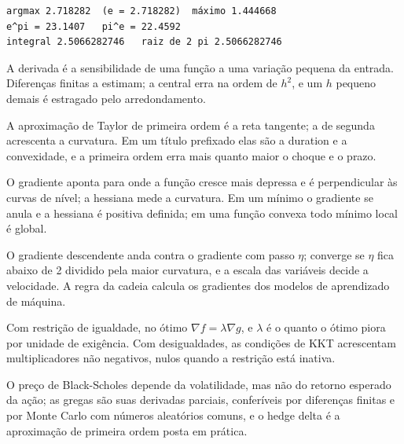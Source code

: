 
\begin{lstlisting}[style=saida]
argmax 2.718282  (e = 2.718282)  máximo 1.444668
e^pi = 23.1407   pi^e = 22.4592
integral 2.5066282746   raiz de 2 pi 2.5066282746
\end{lstlisting}

\begin{resumo}
  \item A derivada é a sensibilidade de uma função a uma variação pequena da entrada. Diferenças finitas a estimam; a central erra na ordem de $h^2$, e um $h$ pequeno demais é estragado pelo arredondamento.
  \item A aproximação de Taylor de primeira ordem é a reta tangente; a de segunda acrescenta a curvatura. Em um título prefixado elas são a duration e a convexidade, e a primeira ordem erra mais quanto maior o choque e o prazo.
  \item O gradiente aponta para onde a função cresce mais depressa e é perpendicular às curvas de nível; a hessiana mede a curvatura. Em um mínimo o gradiente se anula e a hessiana é positiva definida; em uma função convexa todo mínimo local é global.
  \item O gradiente descendente anda contra o gradiente com passo $\eta$; converge se $\eta$ fica abaixo de 2 dividido pela maior curvatura, e a escala das variáveis decide a velocidade. A regra da cadeia calcula os gradientes dos modelos de aprendizado de máquina.
  \item Com restrição de igualdade, no ótimo $\nabla f = \lambda\nabla g$, e $\lambda$ é o quanto o ótimo piora por unidade de exigência. Com desigualdades, as condições de KKT acrescentam multiplicadores não negativos, nulos quando a restrição está inativa.
  \item O preço de Black-Scholes depende da volatilidade, mas não do retorno esperado da ação; as gregas são suas derivadas parciais, conferíveis por diferenças finitas e por Monte Carlo com números aleatórios comuns, e o hedge delta é a aproximação de primeira ordem posta em prática.
\end{resumo}

